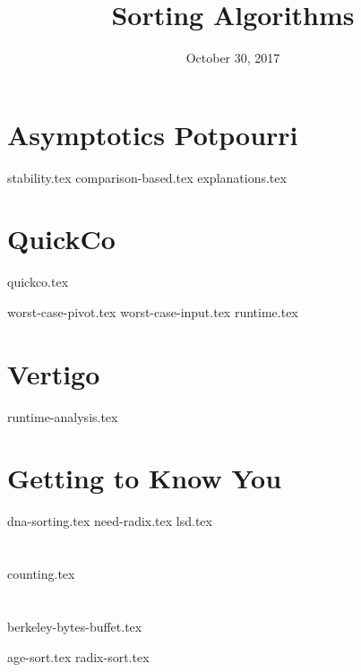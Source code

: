 \documentclass[11pt]{exam}
\title{Sorting Algorithms}
\date{October 30, 2017}
\begin{document}
\maketitle

\section{Asymptotics Potpourri}
{stability.tex}
{comparison-based.tex}
{explanations.tex}


\section{QuickCo}
{quickco.tex}
\begin{questions}
{worst-case-pivot.tex}
{worst-case-input.tex}
{runtime.tex}
\end{questions}

\section{Vertigo}
\begin{questions}
{runtime-analysis.tex}
\end{questions}

\clearpage

\section{Getting to Know You}
\begin{questions}
{dna-sorting.tex}
{need-radix.tex}
{lsd.tex}
\end{questions}

\section{}
{counting.tex}

\section{}
{berkeley-bytes-buffet.tex}
\begin{questions}
{age-sort.tex}
{radix-sort.tex}
\end{questions}
\end{document}
